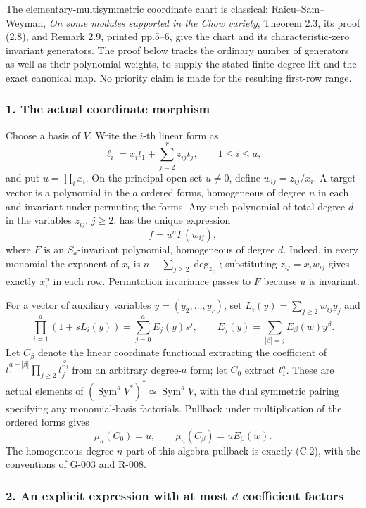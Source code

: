 \documentclass[
  10pt,
]{article}
\begin{document}
The elementary-multisymmetric coordinate chart is classical:
Raicu--Sam--Weyman, \emph{On some modules supported in the Chow
variety}, Theorem 2.3, its proof (2.8), and Remark 2.9, printed pp.5--6,
give the chart and its characteristic-zero invariant generators. The
proof below tracks the ordinary number of generators as well as their
polynomial weights, to supply the stated finite-degree lift and the
exact canonical map. No priority claim is made for the resulting
first-row range.

\subsubsection{1. The actual coordinate
morphism}\label{the-actual-coordinate-morphism}

Choose a basis of \(V\). Write the \(i\)-th linear form as \[
 \ell_i=x_i t_1+\sum_{j=2}^{r}z_{ij}t_j,\qquad 1\le i\le a,
\] and put \(u=\prod_i x_i\). On the principal open set \(u\ne0\),
define \(w_{ij}=z_{ij}/x_i\). A target vector is a polynomial in the
\(a\) ordered forms, homogeneous of degree \(n\) in each and invariant
under permuting the forms. Any such polynomial of total degree \(d\) in
the variables \(z_{ij}\), \(j\ge2\), has the unique expression \[
 f=u^n F(w_{ij}),
\tag{C.3}
\] where \(F\) is an \(S_a\)-invariant polynomial, homogeneous of degree
\(d\). Indeed, in every monomial the exponent of \(x_i\) is
\(n-\sum_{j\ge2}\deg_{z_{ij}}\); substituting \(z_{ij}=x_iw_{ij}\) gives
exactly \(x_i^n\) in each row. Permutation invariance passes to \(F\)
because \(u\) is invariant.

For a vector of auxiliary variables \(y=(y_2,\ldots,y_r)\), set
\(L_i(y)=\sum_{j\ge2}w_{ij}y_j\) and \[
 \prod_{i=1}^a(1+sL_i(y))
 =\sum_{j=0}^a E_j(y)s^j,
 \qquad E_j(y)=\sum_{|\beta|=j}E_\beta(w)y^\beta.
\tag{C.4}
\] Let \(C_\beta\) denote the linear coordinate functional extracting
the coefficient of \(t_1^{a-|\beta|}\prod_{j\ge2}t_j^{\beta_j}\) from an
arbitrary degree-\(a\) form; let \(C_0\) extract \(t_1^a\). These are
actual elements of
\((\operatorname{Sym}^aV^*)^*\simeq\operatorname{Sym}^aV\), with the
dual symmetric pairing specifying any monomial-basis factorials.
Pullback under multiplication of the ordered forms gives \[
 \mu_a(C_0)=u,
 \qquad \mu_a(C_\beta)=uE_\beta(w).
\tag{C.5}
\] The homogeneous degree-\(n\) part of this algebra pullback is exactly
(C.2), with the conventions of G-003 and R-008.

\subsubsection{\texorpdfstring{2. An explicit expression with at most
\(d\) coefficient
factors}{2. An explicit expression with at most d coefficient factors}}\label{an-explicit-expression-with-at-most-d-coefficient-factors}
\end{document}
